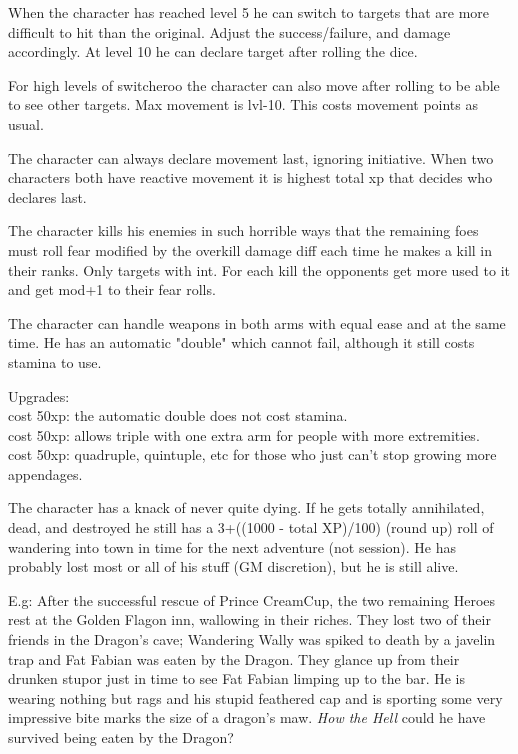 When the character has reached level 5 he can switch to targets that are more difficult to hit than the original. Adjust the success/failure, and damage accordingly. At level 10 he can declare target after rolling the dice.

For high levels of switcheroo the character can also move after rolling to be able to see other targets. Max movement is lvl-10. This costs movement points as usual.


 The character can always declare movement last, ignoring initiative. When two characters both have reactive movement it is highest total xp that decides who declares last.


 The character kills his enemies in such horrible ways that the remaining foes must roll fear modified by the overkill damage diff each time he makes a kill in their ranks. Only targets with int. For each kill the opponents get more used to it and get mod+1 to their fear rolls.




 The character can handle weapons in both arms with equal ease and at the same time. He has an automatic "double" which cannot fail, although it still costs stamina to use.

Upgrades:\\
cost 50xp: the automatic double does not cost stamina. \\
cost 50xp: allows triple with one extra arm for people with more extremities. \\
cost 50xp: quadruple, quintuple, etc for those who just can't stop growing more appendages.


 The character has a knack of never quite dying. If he gets totally annihilated, dead, and destroyed he still has a 3+((1000 - total XP)/100) (round up) roll of wandering into town in time for the next adventure (not session). He has probably lost most or all of his stuff (GM discretion), but he is still alive.

E.g: After the successful rescue of Prince CreamCup, the two remaining Heroes rest at the Golden Flagon inn, wallowing in their riches. They lost two of their friends in the Dragon's cave; Wandering Wally was spiked to death by a javelin trap and Fat Fabian was eaten by the Dragon. They glance up from their drunken stupor just in time to see Fat Fabian limping up to the bar. He is wearing nothing but rags and his stupid feathered cap and is sporting some very impressive bite marks the size of a dragon's maw. \emph{How the Hell} could he have survived being eaten by the Dragon?


